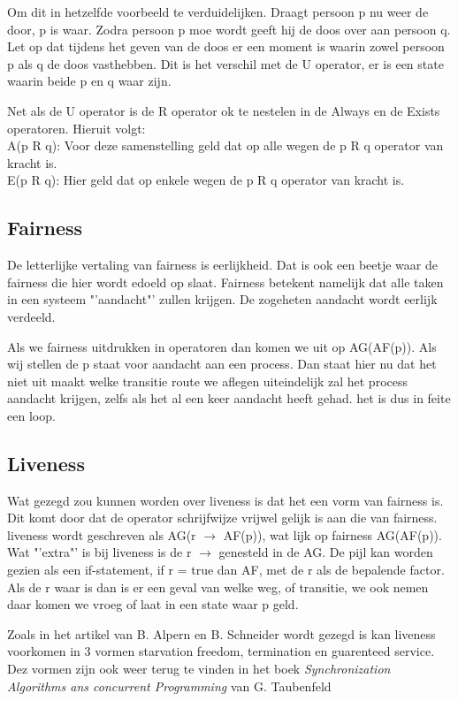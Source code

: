 \documentclass{article}%
\begin{document}
Om dit in hetzelfde voorbeeld te verduidelijken. Draagt persoon p nu weer de door, p is waar. Zodra persoon p moe wordt geeft hij de doos over aan persoon q. Let op dat tijdens het geven van de doos er een moment is waarin zowel persoon p als q de doos vasthebben. Dit is het verschil met de U operator, er is een state waarin beide p en q waar zijn.

Net als de U operator is de R operator ok te nestelen in de Always en de Exists operatoren. Hieruit volgt:
\\
A(p R q): Voor deze samenstelling geld dat op alle wegen de p R q operator van kracht is.
\\
E(p R q): Hier geld dat op enkele wegen de p R q operator van kracht is.



\subsection{Fairness}
De letterlijke vertaling van fairness is eerlijkheid. Dat is ook een beetje waar de fairness die hier wordt edoeld op slaat. Fairness betekent namelijk dat alle taken in een systeem "'aandacht"' zullen krijgen. De zogeheten aandacht wordt eerlijk verdeeld.

Als we fairness uitdrukken in operatoren dan komen we uit op AG(AF(p)). Als wij stellen de p staat voor aandacht aan een process. Dan staat hier nu dat het niet uit maakt welke transitie route we aflegen uiteindelijk zal het process aandacht krijgen, zelfs als het al een keer aandacht heeft gehad. het is dus in feite een loop.

\subsection{Liveness}
Wat gezegd zou kunnen worden over liveness is dat het een vorm van fairness is. Dit komt door dat de operator schrijfwijze  vrijwel gelijk is aan die van fairness. liveness wordt geschreven als AG(r $\rightarrow$ AF(p)), wat lijk op fairness AG(AF(p)). Wat "'extra"' is bij liveness is de r $\rightarrow$ genesteld in de AG. De pijl kan worden gezien als een if-statement, if r = true dan AF, met de r als de bepalende factor. Als de r waar is dan is er een geval van welke weg, of transitie, we ook nemen daar komen we vroeg of laat in een state waar p geld.

Zoals in het artikel van B. Alpern en B. Schneider\cite{definingliveness} wordt gezegd is kan liveness voorkomen in 3 vormen starvation freedom, termination en guarenteed service. Dez vormen zijn ook weer terug te vinden in het boek \textit{Synchronization Algorithms ans concurrent Programming}\cite{synchronizationalgorithms} van G. Taubenfeld
\end{document}
